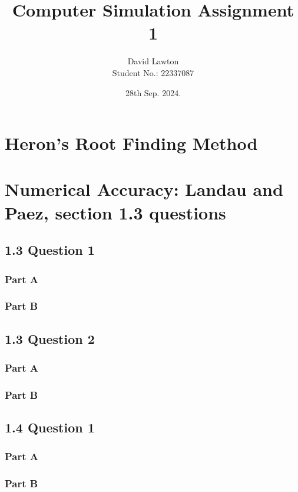 \documentclass{article}
\title{Computer Simulation Assignment 1}
\author{David Lawton\\ Student No.: 22337087}
\date{28th Sep. 2024.}
\theoremstyle{definition}
\theoremstyle{remark}
\begin{document}
\maketitle

\tableofcontents

\newpage

\section{Heron's Root Finding Method}
\section{Numerical Accuracy: Landau and Paez, section 1.3 questions}

\subsection{1.3 Question 1}

\subsubsection{Part A}

\subsubsection{Part B}

\subsection{1.3 Question 2}

\subsubsection{Part A}

\subsubsection{Part B}

\subsection{1.4 Question 1}

\subsubsection{Part A}

\subsubsection{Part B}
\end{document}
